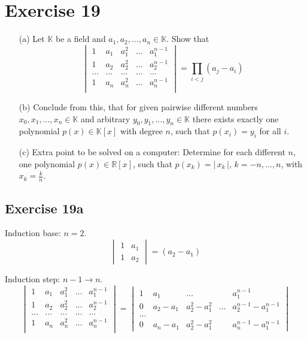 \documentclass[a4paper]{article}
\theoremstyle{definition}
\newcommand\card[1]{\left|\,#1\,\right|}
\begin{document}
\section{Exercise 19}
\begin{ex}
  \begin{enumerate}
    \item[(a)]
      Let $\mathbb K$ be a field and $a_1, a_2, \dots, a_n \in \mathbb K$. Show that
      \[
        \begin{vmatrix}
          1 & a_1 & a_1^2 & \ldots & a_1^{n-1} \\
          1 & a_2 & a_2^2 & \ldots & a_2^{n-1} \\
          \ldots & \ldots & \ldots & \ldots & \ldots \\
          1 & a_n & a_n^2 & \ldots & a_n^{n-1} \\
        \end{vmatrix}
        = \prod_{i < j} (a_j - a_i)
      \]
    \item[(b)]
      Conclude from this, that for given pairwise different numbers $x_0, x_1, \ldots, x_n \in \mathbb K$
      and arbitrary $y_0, y_1, \ldots, y_n \in \mathbb K$ there exists exactly one polynomial $p(x) \in \mathbb K[x]$ with degree $n$,
      such that $p(x_i) = y_i$ for all $i$.
    \item[(c)]
      Extra point to be solved on a computer:
      Determine for each different $n$, one polynomial $p(x) \in \mathbb R[x]$, such that $p(x_k) = \card{x_k}$, $k = -n, \ldots, n$, with $x_k = \frac{k}{n}$.
  \end{enumerate}
\end{ex}

\subsection{Exercise 19a}

Induction base: $n=2$.
\[ \begin{vmatrix} 1 & a_1 \\ 1 & a_2 \end{vmatrix} = (a_2 - a_1) \]

Induction step: $n-1 \to n$.
\[
  \begin{vmatrix}
    1 & a_1 & a_1^2 & \ldots & a_1^{n-1} \\
    1 & a_2 & a_2^2 & \ldots & a_2^{n-1} \\
    \ldots & \ldots & \ldots & \ldots & \ldots \\
    1 & a_n & a_n^2 & \ldots & a_n^{n-1} \\
  \end{vmatrix}
  = \begin{vmatrix}
    1 & a_1       & \ldots        &        & a_1^{n-1} \\
    0 & a_2 - a_1 & a_2^2 - a_1^2 & \ldots & a_2^{n-1} - a_1^{n-1} \\
    \ldots & & & & \\
    0 & a_n-a_1 & a_2^2 - a_1^2 & & a_n^{n-1} - a_1^{n-1}
  \end{vmatrix}
\]
\end{document}

